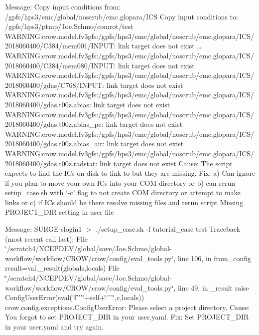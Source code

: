Message\-: Copy input conditions from\-: /gpfs/hps3/emc/global/noscrub/emc.glopara/\-I\-C\-S Copy input conditions to\-: /gpfs/hps3/ptmp/\-Joe.Schmo/comrot/test W\-A\-R\-N\-I\-N\-G\-:crow.\-model.\-fv3gfs\-:/gpfs/hps3/emc/global/noscrub/emc.glopara/\-I\-C\-S/2018060400/\-C384/mem001/\-I\-N\-P\-U\-T\-: link target does not exist … W\-A\-R\-N\-I\-N\-G\-:crow.\-model.\-fv3gfs\-:/gpfs/hps3/emc/global/noscrub/emc.glopara/\-I\-C\-S/2018060400/\-C384/mem080/\-I\-N\-P\-U\-T\-: link target does not exist W\-A\-R\-N\-I\-N\-G\-:crow.\-model.\-fv3gfs\-:/gpfs/hps3/emc/global/noscrub/emc.glopara/\-I\-C\-S/2018060400/gdas/\-C768/\-I\-N\-P\-U\-T\-: link target does not exist W\-A\-R\-N\-I\-N\-G\-:crow.\-model.\-fv3gfs\-:/gpfs/hps3/emc/global/noscrub/emc.glopara/\-I\-C\-S/2018060400/gdas.\-t00z.\-abias\-: link target does not exist W\-A\-R\-N\-I\-N\-G\-:crow.\-model.\-fv3gfs\-:/gpfs/hps3/emc/global/noscrub/emc.glopara/\-I\-C\-S/2018060400/gdas.\-t00z.\-abias\-\_\-pc\-: link target does not exist W\-A\-R\-N\-I\-N\-G\-:crow.\-model.\-fv3gfs\-:/gpfs/hps3/emc/global/noscrub/emc.glopara/\-I\-C\-S/2018060400/gdas.\-t00z.\-abias\-\_\-air\-: link target does not exist W\-A\-R\-N\-I\-N\-G\-:crow.\-model.\-fv3gfs\-:/gpfs/hps3/emc/global/noscrub/emc.glopara/\-I\-C\-S/2018060400/gdas.\-t00z.\-radstat\-: link target does not exist Cause\-: The script expects to find the I\-Cs on disk to link to but they are missing. Fix\-: a) Can ignore if you plan to move your own I\-Cs into your C\-O\-M directory or b) can rerun setup\-\_\-case.\-sh with ‘-\/c’ flag to not create C\-O\-M directory or attempt to make links or c) if I\-Cs should be there resolve missing files and rerun script Missing P\-R\-O\-J\-E\-C\-T\-\_\-\-D\-I\-R setting in user file

Message\-: S\-U\-R\-G\-E-\/slogin1 $>$ ./setup\-\_\-case.sh -\/f tutorial\-\_\-case test Traceback (most recent call last)\-: File \char`\"{}/scratch4/\-N\-C\-E\-P\-D\-E\-V/global/save/\-Joe.\-Schmo/global-\/workflow/workflow/\-C\-R\-O\-W/crow/config/eval\-\_\-tools.\-py\char`\"{}, line 106, in from\-\_\-config result=val.\-\_\-result(globals,locals) File \char`\"{}/scratch4/\-N\-C\-E\-P\-D\-E\-V/global/save/\-Joe.\-Schmo/global-\/workflow/workflow/\-C\-R\-O\-W/crow/config/eval\-\_\-tools.\-py\char`\"{}, line 49, in \-\_\-result raise Config\-User\-Error(eval(\char`\"{}f'''\char`\"{}+self+\char`\"{}'''\char`\"{},c,locals)) crow.\-config.\-exceptions.\-Config\-User\-Error\-: Please select a project directory. Cause\-: You forgot to set P\-R\-O\-J\-E\-C\-T\-\_\-\-D\-I\-R in your user.\-yaml. Fix\-: Set P\-R\-O\-J\-E\-C\-T\-\_\-\-D\-I\-R in your user.\-yaml and try again. 